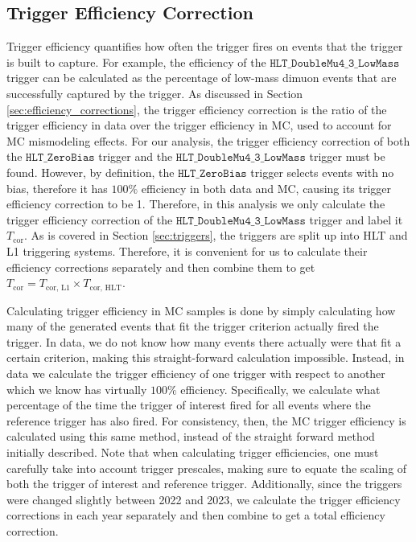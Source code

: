 \subsection{Trigger Efficiency Correction}
\label{subsec:trigger_efficency_correction}

Trigger efficiency quantifies how often the trigger fires on events that the trigger is built to capture. For example, the efficiency of the $\texttt{HLT\_DoubleMu4\_3\_LowMass}$ trigger can be calculated as the percentage of low-mass dimuon events that are successfully captured by the trigger. As discussed in Section \ref{sec:efficiency_corrections}, the trigger efficiency correction is the ratio of the trigger efficiency in data over the trigger efficiency in MC, used to account for MC mismodeling effects. For our analysis, the trigger efficiency correction of both the $\texttt{HLT\_ZeroBias}$ trigger and the $\texttt{HLT\_DoubleMu4\_3\_LowMass}$ trigger must be found. However, by definition, the $\texttt{HLT\_ZeroBias}$ trigger selects events with no bias, therefore it has $100\%$ efficiency in both data and MC, causing its trigger efficiency correction to be 1. Therefore, in this analysis we only calculate the trigger efficiency correction of the $\texttt{HLT\_DoubleMu4\_3\_LowMass}$ trigger and label it $T_{\text{cor}}$. As is covered in Section \ref{sec:triggers}, the triggers are split up into HLT and L1 triggering systems. Therefore, it is convenient for us to calculate their efficiency corrections separately and then combine them to get $T_{\text{cor}} = T_{\text{cor, L1}} \times T_{\text{cor, HLT}}$.

Calculating trigger efficiency in MC samples is done by simply calculating how many of the generated events that fit the trigger criterion actually fired the trigger. In data, we do not know how many events there actually were that fit a certain criterion, making this straight-forward calculation impossible. Instead, in data we calculate the trigger efficiency of one trigger with respect to another which we know has virtually $100\%$ efficiency. Specifically, we calculate what percentage of the time the trigger of interest fired for all events where the reference trigger has also fired. For consistency, then, the MC trigger efficiency is calculated using this same method, instead of the straight forward method initially described. Note that when calculating trigger efficiencies, one must carefully take into account trigger prescales, making sure to equate the scaling of both the trigger of interest and reference trigger. Additionally, since the triggers were changed slightly between 2022 and 2023, we calculate the trigger efficiency corrections in each year separately and then combine to get a total efficiency correction.

